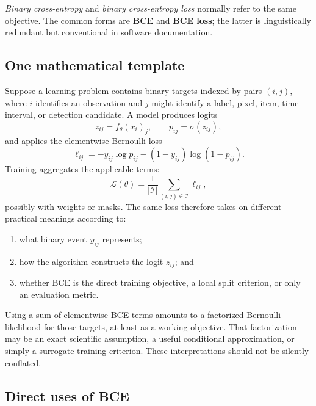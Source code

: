 \documentclass[11pt]{article}
\newcommand{\sigmoid}{\sigma}
\theoremstyle{definition}
\begin{document}
\begin{keyidea}
\emph{Binary cross-entropy} and \emph{binary cross-entropy loss} normally refer to the same objective. The common forms are \textbf{BCE} and \textbf{BCE loss}; the latter is linguistically redundant but conventional in software documentation.
\end{keyidea}

\subsection{One mathematical template}

Suppose a learning problem contains binary targets indexed by pairs $(i,j)$, where $i$ identifies an observation and $j$ might identify a label, pixel, item, time interval, or detection candidate. A model produces logits
\[
z_{ij}=f_\theta(x_i)_j,
\qquad
p_{ij}=\sigmoid(z_{ij}),
\]
and applies the elementwise Bernoulli loss
\begin{equation}
\ell_{ij}
=-y_{ij}\log p_{ij}-(1-y_{ij})\log(1-p_{ij}).
\label{eq:appendix-general-bce}
\end{equation}
Training aggregates the applicable terms:
\begin{equation}
\mathcal L(\theta)
=\frac{1}{|\mathcal I|}
\sum_{(i,j)\in\mathcal I}\ell_{ij},
\label{eq:appendix-bce-reduction}
\end{equation}
possibly with weights or masks. The same loss therefore takes on different practical meanings according to:
\begin{enumerate}
  \item what binary event $y_{ij}$ represents;
  \item how the algorithm constructs the logit $z_{ij}$; and
  \item whether BCE is the direct training objective, a local split criterion, or only an evaluation metric.
\end{enumerate}

Using a sum of elementwise BCE terms amounts to a factorized Bernoulli likelihood for those targets, at least as a working objective. That factorization may be an exact scientific assumption, a useful conditional approximation, or simply a surrogate training criterion. These interpretations should not be silently conflated.

\clearpage
\thispagestyle{fancy}
\subsection{Direct uses of BCE}
\end{document}
